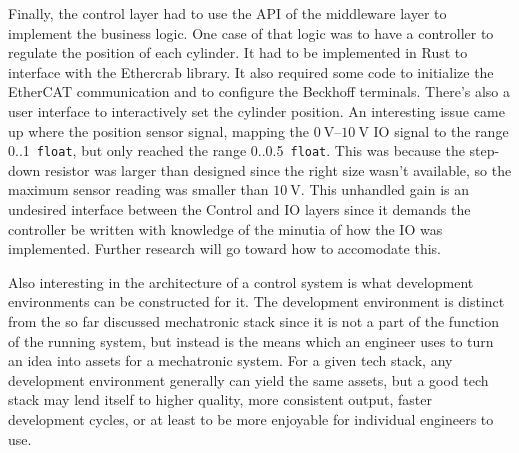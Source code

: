 \documentclass[english,12pt,a4paper,pdftex,eng,utf8]{aaltothesis}
\begin{document}
Finally, the control layer had to use the API of the middleware layer to implement the business logic. One case of that logic was to have a controller to regulate the position of each cylinder. It had to be implemented in Rust to interface with the Ethercrab library. It also required some code to initialize the EtherCAT communication and to configure the Beckhoff terminals. There's also a user interface to interactively set the cylinder position. An interesting issue came up where the position sensor signal, mapping the $\qtyrange[range-units=single,range-phrase=..]{0}{10}{\volt}$ IO signal to the range 0..1~\verb|float|, but only reached the range 0..0.5~\verb|float|. This was because the step-down resistor was larger than designed since the right size wasn't available, so the maximum sensor reading was smaller than $\qty{10}{\volt}$. This unhandled gain is an undesired interface between the Control and IO layers since it demands the controller be written with knowledge of the minutia of how the IO was implemented. Further research will go toward how to accomodate this.

Also interesting in the architecture of a control system is what development environments can be constructed for it.  The development environment is distinct from the so far discussed mechatronic stack since it is not a part of the function of the running system, but instead is the means which an engineer uses to turn an idea into assets for a mechatronic system.  For a given tech stack, any development environment generally can yield the same assets, but a good tech stack may lend itself to higher quality, more consistent output, faster development cycles, or at least to be more enjoyable for individual engineers to use.
\end{document}
